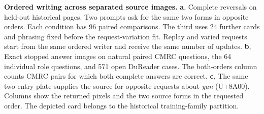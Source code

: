\textbf{Ordered writing across separated source images.}
\textbf{a}, Complete reversals on held-out historical pages. Two prompts ask for the same two forms in opposite orders. Each condition has 96 paired comparisons. The third uses 24 further cards and phrasing fixed before the request-variation fit. Replay and varied requests start from the same ordered writer and receive the same number of updates.
\textbf{b}, Exact stopped answer images on natural paired CMRC questions, the 64 individual role questions, and 571 open DuReader cases. The both-orders column counts CMRC pairs for which both complete answers are correct.
\textbf{c}, The same two-entry plate supplies the source for opposite requests about \textit{yan} (U+8A00). Columns show the returned pixels and the two source forms in the requested order. The depicted card belongs to the historical training-family partition.
